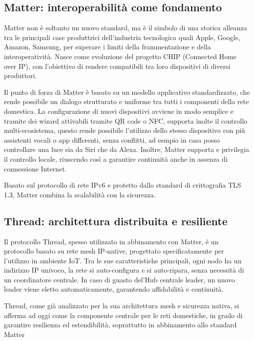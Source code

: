 \subsection{Matter: interoperabilità come fondamento}

Matter non è soltanto un nuovo standard, ma è il simbolo di una storica alleanza tra le principali case produttrici dell’industria tecnologica quali Apple, Google, Amazon, Samsung, per superare i limiti della frammentazione e della interoperatività. Nasce come evoluzione del progetto CHIP (Connected Home over IP), con l'obiettivo di rendere compatibili tra loro dispositivi di diversi produttori.

Il punto di forza di Matter è basato su un modello applicativo standardizzato, che rende possibile un dialogo strutturato e uniforme tra tutti i componenti della rete domestica. La configurazione di nuovi dispositivi avviene in modo semplice e tramite dei wizard attivabili tramite QR code o NFC, supporta inolte il controllo multi-ecosistema, questo rende possibile l’utilizzo dello stesso dispositivo con più assistenti vocali o app differenti, senza conflitti, ad esmpio in casa posso controllare una luce sia da Siri che da Alexa. Inoltre, Matter supporta e privilegia il controllo locale, riuscendo così a garantire continuità anche in assenza di connessione Internet.

Basato sul protocollo di rete IPv6 e protetto dallo standard di crittografia TLS 1.3, Matter combina la scalabilità con la sicurezza.

\subsection{Thread: architettura distribuita e resiliente}

Il protocollo Thread, spesso utilizzato in abbinamento con Matter, è un protocollo basato su rete mesh IP-native, progettato specificatamente per l'utilizzo in ambiente IoT. Tra le sue caratteristiche principali, ogni nodo ha un indirizzo IP univoco, la rete si auto-configura e si auto-ripara, senza necessità di un coordinatore centrale. In caso di guasto del'Hub centrale leader, un nuovo leader viene eletto automaticamente, garantendo affidabilità e continuità.

Thread, come già analizzato per la sua architettura mesh e sicurezza nativa, si afferma ad oggi come la componente centrale per le reti domestiche, in grado di garantire resilienza ed estendibilità, soprattutto in abbinamento allo standard Matter 

